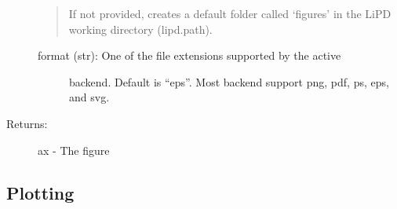 \documentclass[letterpaper,10pt,english]{sphinxmanual}
\begin{document}
\begin{fulllineitems}
\begin{description}
\begin{quote}
If not provided, creates a default folder called ‘figures’ in the
LiPD working directory (lipd.path).
\end{quote}
\begin{description}
\item[{format (str): One of the file extensions supported by the active}] \leavevmode
backend. Default is “eps”. Most backend support png, pdf, ps, eps,
and svg.

\end{description}

\item[{Returns:}] \leavevmode
ax - The figure

\end{description}

\end{fulllineitems}



\subsection{Plotting}
\label{\detokenize{Main:plotting}}
\end{document}
